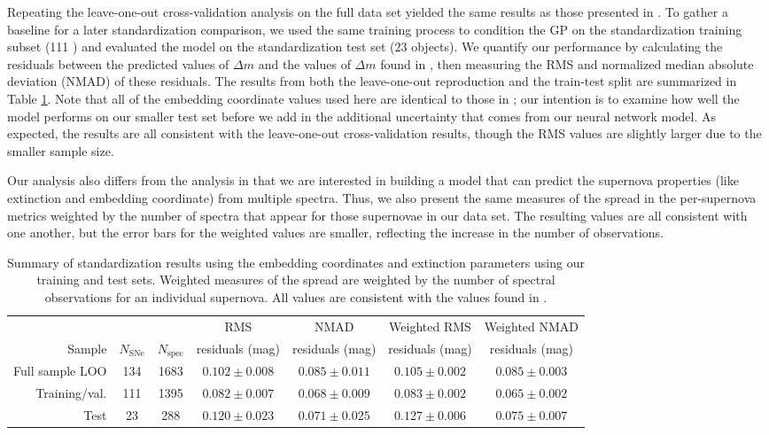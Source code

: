 Repeating the leave-one-out cross-validation analysis on the full data set yielded the same results as those presented in . To gather a baseline for a later standardization comparison, we used the same training process to condition the GP on the standardization training subset (111 \sne) and evaluated the model on the standardization test set (23 objects). We quantify our performance by calculating the residuals between the predicted values of $\Delta m$ and the values of $\Delta m$ found in , then measuring the RMS and normalized median absolute deviation (NMAD) of these residuals. The results from both the leave-one-out reproduction and the train-test split are summarized in Table \ref{tab:standardization_test_results}. Note that all of the embedding coordinate values used here are identical to those in ; our intention is to examine how well the model performs on our smaller test set before we add in the additional uncertainty that comes from our neural network model. As expected, the results are all consistent with the leave-one-out cross-validation results, though the RMS values are slightly larger due to the smaller sample size.

Our analysis also differs from the  analysis in that we are interested in building a model that can predict the supernova properties (like extinction and embedding coordinate) from multiple spectra. Thus, we also present the same measures of the spread in the per-supernova metrics weighted by the number of spectra that appear for those supernovae in our data set. The resulting values are all consistent with one another, but the error bars for the weighted values are smaller, reflecting the increase in the number of observations.

\begin{table}
    \centering
    \begin{tabular}{rcccccc}\toprule
        & & & RMS & NMAD & Weighted RMS & Weighted NMAD\\
        Sample & $N_\textrm{SNe}$ & $N_\textrm{spec}$ & residuals (mag) & residuals (mag) & residuals (mag) & residuals (mag)\\\midrule
        Full sample LOO & 134 & 1683 & $0.102 \pm 0.008$ & $0.085 \pm 0.011$ & $0.105 \pm 0.002$ & $0.085 \pm 0.003$\\\midrule
        Training/val. & 111 & 1395 & $0.082\pm 0.007$ & $0.068\pm 0.009$ & $0.083\pm 0.002$ & $0.065\pm 0.002$\\
        Test & 23 & 288 & $0.120\pm 0.023$ &  $0.071\pm 0.025$ & $0.127\pm 0.006$ & $0.075\pm 0.007$\\
    \bottomrule
    \end{tabular}
    \caption{Summary of standardization results using the  embedding coordinates and extinction parameters using our training and test sets. Weighted measures of the spread are weighted by the number of spectral observations for an individual supernova. All values are consistent with the values found in .}
    \label{tab:standardization_test_results}
\end{table}


